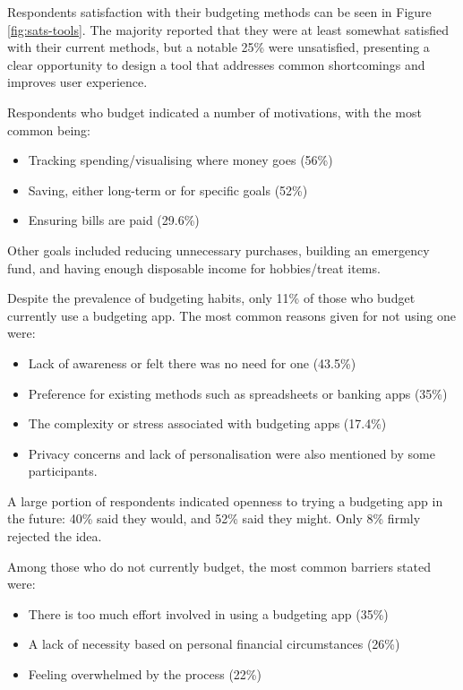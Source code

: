\documentclass{l4proj}
\begin{document}
\begin{appendices}
Respondents satisfaction with their budgeting methods can be seen in Figure \ref{fig:sats-tools}. The majority reported that they were at least somewhat satisfied with their current methods, but a notable 25\% were unsatisfied, presenting a clear opportunity to design a tool that addresses common shortcomings and improves user experience.

Respondents who budget indicated a number of motivations, with the most common being:
\begin{itemize}
    \item Tracking spending/visualising where money goes (56\%)
    \item Saving, either long-term or for specific goals (52\%)
    \item Ensuring bills are paid (29.6\%)
\end{itemize}

Other goals included reducing unnecessary purchases, building an emergency fund, and having enough disposable income for hobbies/treat items.

Despite the prevalence of budgeting habits, only 11\% of those who budget currently use a budgeting app. The most common reasons given for not using one were:
\begin{itemize}
    \item Lack of awareness or felt there was no need for one (43.5\%)
    \item Preference for existing methods such as spreadsheets or banking apps (35\%)
    \item The complexity or stress associated with budgeting apps (17.4\%)
    \item Privacy concerns and lack of personalisation were also mentioned by some participants.
\end{itemize}

A large portion of respondents indicated openness to trying a budgeting app in the future: 40\% said they would, and 52\% said they might. Only 8\% firmly rejected the idea.

Among those who do not currently budget, the most common barriers stated were:
\begin{itemize}
    \item There is too much effort involved in using a budgeting app (35\%)
    \item A lack of necessity based on personal financial circumstances (26\%)
    \item Feeling overwhelmed by the process (22\%)
\end{itemize}


\end{appendices}
\end{document}
